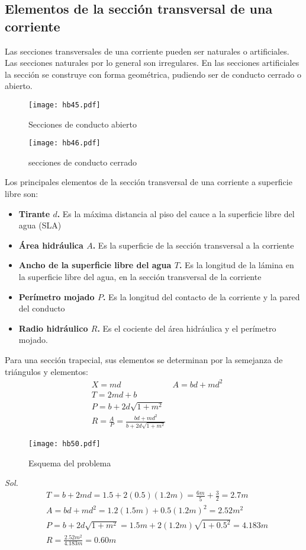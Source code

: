 \subsection{Elementos de la sección transversal de una corriente}
Las secciones transversales de una corriente pueden ser naturales o artificiales. Las secciones naturales por lo general son irregulares. En las secciones artificiales la sección se construye con forma geométrica, pudiendo ser de conducto cerrado o abierto.
\begin{figure}[h!]
\centering
  \texttt{[image: hb45.pdf]}
  \caption{Secciones de conducto abierto}
  \label{hb45}
\end{figure}
\begin{figure}[h!]
    \centering
      \texttt{[image: hb46.pdf]}
      \caption{secciones de conducto cerrado}
      \label{hb46}
    \end{figure}
Los principales elementos de la sección transversal de una corriente a superficie libre son:
\begin{itemize}
    \item \textbf{Tirante $d$.} Es la máxima distancia al piso del cauce a la superficie libre del agua (SLA)
    \item \textbf{Área hidráulica $A$.} Es la superficie de la sección transversal a la corriente
    \item \textbf{Ancho de la superficie libre del agua $T$.} Es la longitud de la lámina en la superficie libre del agua, en la sección transversal de la corriente
    \item \textbf{Perímetro mojado $P$.} Es la longitud del contacto de la corriente y la pared del conducto
    \item \textbf{Radio hidráulico $R$.} Es el cociente del área hidráulica y el perímetro mojado.
\end{itemize}

Para una sección trapecial, sus elementos se determinan por la semejanza de triángulos y elementos:
\begin{align*}
    &X=md
    &A=bd+md^2\\
    &T=2md+b\\
    &P=b+2d\sqrt{1+m^2}\\
    &R=\frac{A}{P}=\frac{bd+md^2}{b+2d\sqrt{1+m^2}}
\end{align*}

\begin{problem}
\end{problem}
\begin{figure}[h!]
\centering
  \texttt{[image: hb50.pdf]}
  \caption{Esquema del problema}
  \label{hb50}
\end{figure}
\textit{ Sol. }
\begin{align*}
    &T=b+2md=1.5+2(0.5)(1.2m)=\frac{6 m}{5} + \frac{3}{2}=2.7m\\
    &A=bd+md^2=1.2(1.5m)+0.5(1.2m)^2=2.52m^2\\
    &P=b+2d\sqrt{1+m^2}=1.5m+2(1.2m)\sqrt{1+0.5^2}=4.183m\\
    &R=\frac{2.52m^2}{4.183m}=0.60m
\end{align*}

